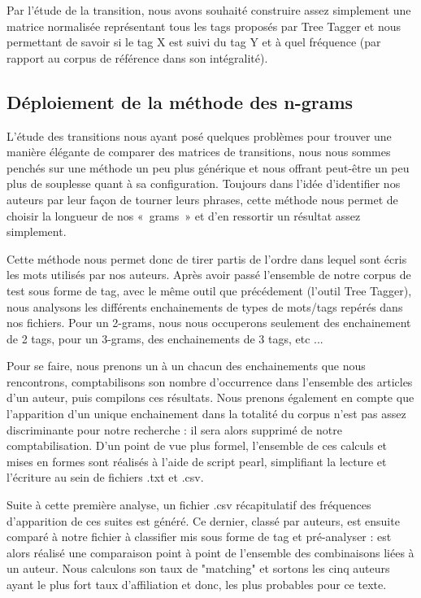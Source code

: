 \documentclass[a4paper]{article}
\begin{document}
Par l'étude de la transition, nous avons souhaité construire assez simplement une matrice normalisée représentant tous les tags proposés par Tree Tagger et nous permettant de savoir si le tag X est suivi du tag Y et à quel fréquence (par rapport au corpus de référence dans son intégralité).


\subsection{Déploiement de la méthode des n-grams}

L'étude des transitions nous ayant posé quelques problèmes pour trouver une manière élégante de comparer des matrices de transitions, nous nous sommes penchés sur une méthode un peu plus générique et nous offrant peut-être un peu plus de souplesse quant à sa configuration. Toujours dans l'idée d'identifier nos auteurs par leur façon de tourner leurs phrases, cette méthode nous permet de choisir la longueur de nos «~grams~» et d'en ressortir un résultat assez simplement.

Cette méthode nous permet donc de tirer partis de l'ordre dans lequel sont écris les mots utilisés par nos auteurs. Après avoir passé l'ensemble de notre corpus de test sous forme de tag, avec le même outil que précédement (l'outil Tree Tagger), nous analysons les différents enchainements de types de mots/tags repérés dans nos fichiers. Pour un 2-grams, nous nous occuperons seulement des enchainement de 2 tags, pour un 3-grams, des enchainements de 3 tags, etc ...

Pour se faire, nous prenons un à un chacun des enchainements que nous rencontrons, comptabilisons son nombre d'occurrence dans l'ensemble des articles d'un auteur, puis compilons ces résultats. Nous prenons également en compte que l'apparition d'un unique enchainement dans la totalité du corpus n'est pas assez discriminante pour notre recherche : il sera alors supprimé de notre comptabilisation. D'un point de vue plus formel, l'ensemble de ces calculs et mises en formes sont réalisés à l'aide de script pearl, simplifiant la lecture et l'écriture au sein de fichiers .txt et .csv.

Suite à cette première analyse, un fichier .csv récapitulatif des fréquences d'apparition de ces suites est généré. Ce dernier, classé par auteurs, est ensuite comparé à notre fichier à classifier mis sous forme de tag et pré-analyser : est alors réalisé une comparaison point à point de l'ensemble des combinaisons liées à un auteur. Nous calculons son taux de "matching" et sortons les cinq auteurs ayant le plus fort taux d'affiliation et donc, les plus probables pour ce texte. 
\end{document}

